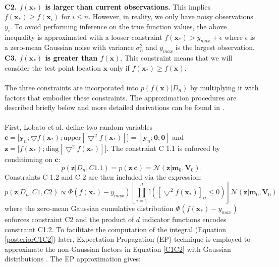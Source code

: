 \documentclass[a4paper,11pt]{report}
\begin{document}
\\
\textbf{C2. $f(\mathbf{x}_{*})$ is larger than current observations.} This implies $f(\mathbf{x}_{*}) \geq f(\mathbf{x}_{i})$ for $i \leq n$. However, in reality, we only have noisy observations $y_i$. To avoid performing inference on the true function values, the above inequality is approximated with a looser constraint $f(\mathbf{x}_{*}) > y_{max} + \epsilon $ where $ \epsilon$ is a zero-mean Gaussian noise with variance $\sigma_{n}^{2}$ and $y_{max}$ is the largest observation. 
\\
\textbf{C3. $ f(\mathbf{x}_{*})$  is greater than $f(\mathbf{x}). $}  This constraint means that we will consider the test point location $\mathbf{x} $ only if $f(\mathbf{x}_{*}) \geq f(\mathbf{x})$. 
\\\\
The three constraints are incorporated into $p ( f(\mathbf{x}) \vert D_n)$ by multiplying it with factors that embodies these constraints. The approximation procedures are described briefly below and more detailed derivations can be found in \cite{hernandez2014predictive}.  
\\\\
First, Lobato et al. define two random variables $\mathbf{c} = \big[ \mathbf{y}_n ; \bigtriangledown f(\mathbf{x}_{*}) ; \text{upper} [\bigtriangledown^2 f(\mathbf{x}_{*}) ] \big] = [ \mathbf{y}_n; \mathbf{0};  \mathbf{0}] $ and $\mathbf{z} = \big[ f(\mathbf{x}_*) ; \text{diag} [\bigtriangledown^2 f(\mathbf{x}_{*})] \big]$. The constraint C 1.1 is enforced by conditioning on $\mathbf{c}$:
\begin{equation} \label{C11}
	p( \mathbf{z} \vert D_n, C 1.1 ) = p(  \mathbf{z} \vert  \mathbf{c}) = \mathcal{N} ( \mathbf{z} \vert \mathbf{m}_0,  		\mathbf{V}_0).
\end{equation}
Constraints C 1.2 and C 2 are then included via the expression: 
	\begin{equation} \label{C1C2}
	p( \mathbf{z} \vert D_n, C1, C2 ) \propto \Phi (f(\mathbf{x}_*)  - y_{max}) \left[  \prod_{i=1}^d \mathbb{I} ([\bigtriangledown^2 f(\mathbf{x}_{*}) ]_{ii} \leq 0) \right] \mathcal{N} ( \mathbf{z} \vert \mathbf{m}_0,  		\mathbf{V}_0)
	\end{equation} 
where the zero-mean Gaussian cumulative distribution $\Phi (f(\mathbf{x}_*)  - y_{max})$ enforces constraint C2 and the product of $d$ indicator functions encodes constraint C1.2. To facilitate the computation of the integral (Equation \ref{posteriorC1C2}) later, Expectation Propagation (EP) technique is employed to approximate the non-Gaussian factors in Equation \ref{C1C2} with Gaussian distributions \cite{rasmussen2006gaussian}. The EP approximation gives: 
\end{document}
